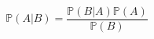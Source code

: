 \documentclass{article}
\begin{document}
    \vfill
    \begin{center}
    \[
    \mathbb{P}(A | B) = \frac{\mathbb{P}(B | A)\mathbb{P}(A)}{\mathbb{P}(B)}
    \]
    \end{center}
    \vfill
    
\end{document}
